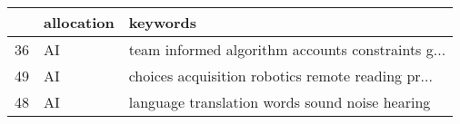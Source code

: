 \begin{tabular}{lll}
\toprule
{} &                                                                                                                                                                                                                                                                                                                                                                                                                                                                                                                                                                                                                                                                                                                                                                                                                                                                                                                                                                                                                               allocation &                                                                                                                                                                                                                                                                                                                                                                                                                                                                                                                                                                                                                                                                                                                                                                                                                                                                                                                                                                                                                                 keywords \\
\midrule
36                                                 &                                                 AI &  team informed algorithm accounts constraints g... \\
49                                                 &                                                 AI &  choices acquisition robotics remote reading pr... \\
48                                                 &                                                 AI &     language translation words sound noise hearing \\

\end{tabular}
